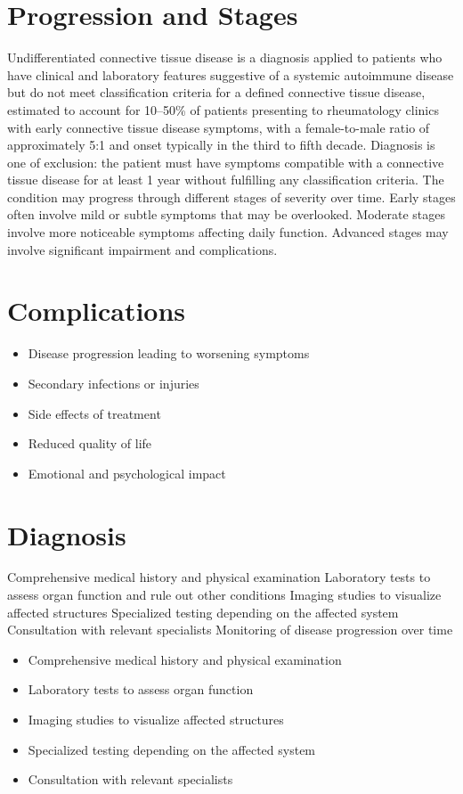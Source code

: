 \section{Progression and Stages}
Undifferentiated connective tissue disease is a diagnosis applied to patients who have clinical and laboratory features suggestive of a systemic autoimmune disease but do not meet classification criteria for a defined connective tissue disease, estimated to account for 10--50\% of patients presenting to rheumatology clinics with early connective tissue disease symptoms, with a female-to-male ratio of approximately 5:1 and onset typically in the third to fifth decade. Diagnosis is one of exclusion: the patient must have symptoms compatible with a connective tissue disease for at least 1 year without fulfilling any classification criteria. The condition may progress through different stages of severity over time. Early stages often involve mild or subtle symptoms that may be overlooked. Moderate stages involve more noticeable symptoms affecting daily function. Advanced stages may involve significant impairment and complications.
\section{Complications}
\begin{itemize}[noitemsep]
  \item Disease progression leading to worsening symptoms
  \item Secondary infections or injuries
  \item Side effects of treatment
  \item Reduced quality of life
  \item Emotional and psychological impact
\end{itemize}
\section{Diagnosis}
Comprehensive medical history and physical examination Laboratory tests to assess organ function and rule out other conditions Imaging studies to visualize affected structures Specialized testing depending on the affected system Consultation with relevant specialists Monitoring of disease progression over time

\begin{itemize}[noitemsep]
  \item Comprehensive medical history and physical examination
  \item Laboratory tests to assess organ function
  \item Imaging studies to visualize affected structures
  \item Specialized testing depending on the affected system
  \item Consultation with relevant specialists
\end{itemize}
